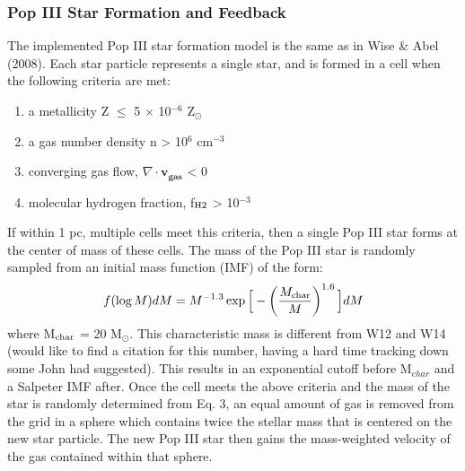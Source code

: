\documentclass[a4paper,fleqn,usenatbib]{mnras}
\begin{document}
\subsubsection{Pop III Star Formation and Feedback }
The implemented Pop III star formation model is the same as in Wise \& Abel (2008). Each star particle represents a single star, and is formed in a cell when the following criteria are met: 
\begin{enumerate}
	\item a metallicity Z $\leq$ 5 $\times$ 10$^{-6}$ Z$_{\odot}$

	\item a gas number density n > 10$^{6}$ cm$^{-3}$

	\item converging gas flow, $\nabla \cdot \mathbf{v_{gas}}$ < 0 

	\item molecular hydrogen fraction, f$_{\rm H2}$ > 10$^{-3}$
\end{enumerate}

If within 1 pc, multiple cells meet this criteria, then a single Pop III star forms at the center of mass of these cells. The mass of the Pop III star is randomly sampled from an initial mass function (IMF) of the form:
\begin{equation} \label{IMF}
	f(\log M)dM = M^{-1.3} \exp \Big[-\left( \frac{M_{\rm char}}{M}\right)^{1.6} \Big]dM
\end{equation}
where M$_{\rm char}$ = 20 M$_{\odot}$. This characteristic mass is different from W12 and W14 (would like to find a citation for this number, having a hard time tracking down some John had suggested). This results in an exponential cutoff before M$_{char}$ and a Salpeter IMF after. Once the cell meets the above criteria and the mass of the star is randomly determined from Eq. 3, an equal amount of gas is removed from the grid in a sphere which contains twice the stellar mass that is centered on the new star particle. The new Pop III star then gains the mass-weighted velocity of the gas contained within that sphere.  
\end{document}
